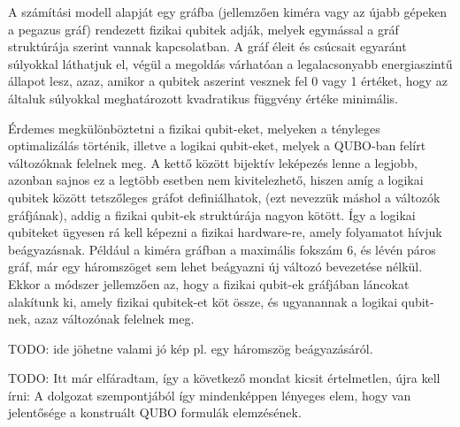 A számítási modell alapját egy gráfba (jellemzően kiméra vagy az újabb gépeken a pegazus gráf) rendezett fizikai qubitek adják, melyek  egymással a gráf struktúrája szerint vannak kapcsolatban. A gráf éleit és csúcsait egyaránt súlyokkal láthatjuk el, végül a megoldás várhatóan a legalacsonyabb energiaszintű állapot lesz, azaz, amikor a qubitek aszerint vesznek fel 0 vagy 1 értéket, hogy az általuk súlyokkal meghatározott kvadratikus függvény értéke minimális.

Érdemes megkülönböztetni a fizikai qubit-eket, melyeken a tényleges optimalizálás történik, illetve a logikai qubit-eket, melyek a QUBO-ban felírt változóknak felelnek meg. A kettő között bijektív leképezés lenne a legjobb, azonban sajnos ez a legtöbb esetben nem kivitelezhető, hiszen amíg a logikai qubitek között tetszőleges gráfot definiálhatok, (ezt nevezzük máshol a változók gráfjának), addig a fizikai qubit-ek struktúrája nagyon kötött. Így a logikai qubiteket ügyesen rá kell képezni a fizikai hardware-re, amely folyamatot hívjuk beágyazásnak.
Például a kiméra gráfban a maximális fokszám 6, és lévén páros gráf, már egy háromszöget sem lehet beágyazni új változó bevezetése nélkül. Ekkor a módszer jellemzően az, hogy a fizikai qubit-ek gráfjában láncokat alakítunk ki, amely fizikai qubitek-et köt össze, és ugyanannak a logikai qubit-nek, azaz változónak felelnek meg.

TODO: ide jöhetne valami jó kép pl. egy háromszög beágyazásáról.

TODO: Itt már elfáradtam, így a következő mondat kicsit értelmetlen, újra kell írni:
A dolgozat szempontjából így mindenképpen lényeges elem, hogy van jelentősége a konstruált QUBO formulák elemzésének. 